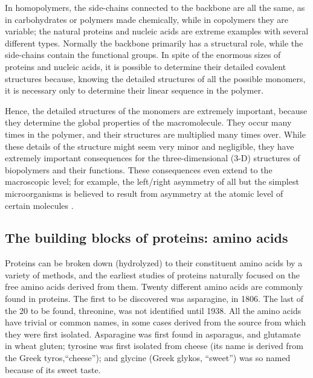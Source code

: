 In homopolymers, the side-chains connected to the backbone are all the same, as in carbohydrates or polymers made chemically, while in copolymers they are variable; the natural proteins and nucleic acids are extreme examples with several different types. Normally the backbone primarily has a structural role, while the side-chains contain the functional groups. In spite of the enormous sizes of proteins and nucleic acids, it is possible to determine their detailed covalent structures because, knowing the detailed structures of all the possible monomers, it is necessary only to determine their linear sequence in the polymer.

Hence, the detailed structures of the monomers are extremely important, because they determine the global properties of the macromolecule. They occur many times in the polymer, and their structures are multiplied many times over. While these details of the structure might seem very minor and negligible, they have extremely important consequences for the three-dimensional (3-D) structures of biopolymers and their functions. These consequences even extend to the macroscopic level; for example, the left/right asymmetry of all but the simplest microorganisms is believed to result from asymmetry at the atomic level of certain molecules
\cite{creighton2010biophysical}.


\subsection{The building blocks of proteins: amino acids}\label{ssec:amino-acids}

Proteins can be broken down (hydrolyzed) to their constituent amino acids by a variety of methods, and the earliest studies of proteins naturally focused on the free amino acids derived from them. Twenty different amino acids are commonly found in proteins. The first to be discovered was asparagine, in 1806. The last of the 20 to be found, threonine, was not identified until 1938. All the amino acids have trivial or common names, in some cases derived from the source from which they were first isolated. Asparagine was first found in asparagus, and glutamate in wheat gluten; tyrosine was first isolated from cheese (its name is derived from the Greek tyros,``cheese''); and glycine (Greek glykos, ``sweet'') was so named because of its sweet taste.
\cite{nelson2008lehninger}


